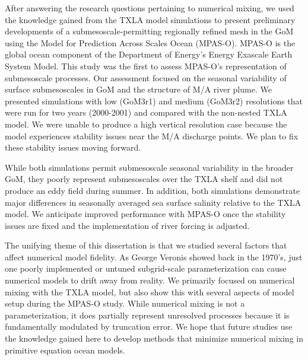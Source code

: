 After answering the research questions pertaining to numerical mixing, we used the knowledge gained from the TXLA model simulations to present preliminary developments of a submesoscale-permitting regionally refined mesh in the GoM using the Model for Prediction Across Scales Ocean (MPAS-O). MPAS-O is the global ocean component of the Department of Energy's Energy Exascale Earth System Model. This study was the first to assess MPAS-O's representation of submesoscale processes. Our assessment focused on the seasonal variability  of surface submesoscales in GoM and the structure of M/A river plume. We presented simulations with low (GoM3r1) and medium (GoM3r2) resolutions that were run for two years (2000-2001) and compared with the non-nested TXLA model. We were unable to produce a high vertical resolution case because the model experiences stability issues near the M/A discharge points. We plan to fix these stability issues moving forward. 

While both simulations permit submesoscale seasonal variability in the broader GoM, they poorly represent submesoscales over the TXLA shelf and did not produce an eddy field during summer. In addition, both simulations demonstrate major differences in seasonally averaged sea surface salinity relative to the TXLA model. We anticipate improved performance with MPAS-O once the stability issues are fixed and the implementation of river forcing is adjusted. 

The unifying theme of this dissertation is that we studied several factors that affect numerical model fidelity. As George Veronis showed back in the 1970's, just one poorly implemented or untuned subgrid-scale parameterization can cause numerical models to drift away from reality. We primarily focused on numerical mixing with the TXLA model, but also show this with several aspects of model setup during the MPAS-O study. While numerical mixing is not a parameterization, it does partially represent unresolved processes because it is fundamentally modulated by truncation error. We hope that future studies use the knowledge gained here to develop methods that minimize numerical mixing in primitive equation ocean models. 


